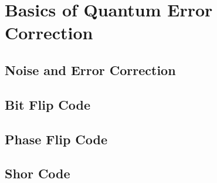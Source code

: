 %
%
\chapter {Basics of Quantum Error Correction}

\section{Noise and Error Correction}

\section{Bit Flip Code}

\section{Phase Flip Code}

\section{Shor Code}
